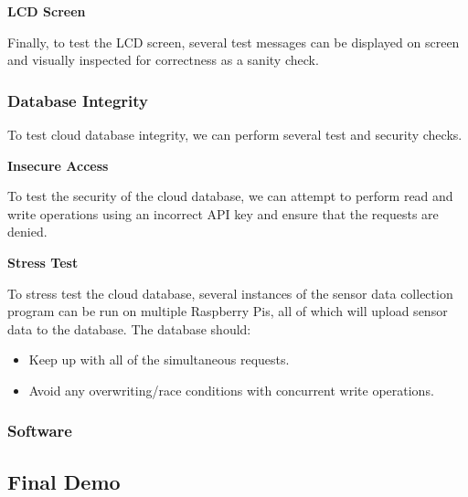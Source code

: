 \textbf{LCD Screen}

Finally, to test the LCD screen, several test messages can be displayed on screen and visually inspected for
correctness as a sanity check.

\subsubsection{Database Integrity}

To test cloud database integrity, we can perform several test and security checks.

\textbf{Insecure Access}

To test the security of the cloud database, we can attempt to perform read and write operations using an incorrect API
key and ensure that the requests are denied.

\textbf{Stress Test}

To stress test the cloud database, several instances of the sensor data collection program can be run on multiple
Raspberry Pis, all of which will upload sensor data to the database. The database should:

\begin{itemize}
    \item Keep up with all of the simultaneous requests.
    \item Avoid any overwriting/race conditions with concurrent write operations.
\end{itemize}

\subsubsection{Software}

\subsection{Final Demo}
